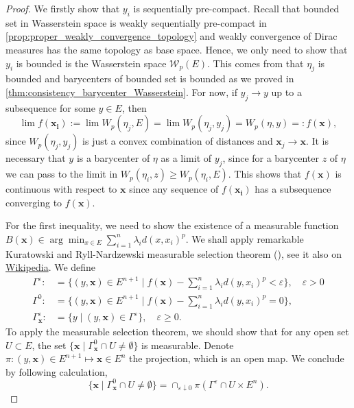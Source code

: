 \begin{proof}
	We firstly show that $y_i$ is sequentially pre-compact.
	Recall that bounded set in Wasserstein space is
	weakly sequentially pre-compact in \cref{prop:proper_weakly_convergence_topology}
	and weakly convergence of Dirac measures has the same topology as base space.
	Hence, we only need to show that $y_i$ is bounded is the Wasserstein space $\mathcal{W}_p(E)$.
	This comes from that $\eta_j$ is bounded and barycenters of bounded set is bounded as we proved in \cref{thm:consistency_barycenter_Wasserstein}.
	For now, if $y_j \rightarrow y$ up to a subsequence for some $y \in E$, then
	\[
		\lim f(\boldsymbol{x_i}) := \lim W_p(\eta_j, E) = \lim W_p(\eta_j, y_j) =  W_p(\eta, y) =: f(\boldsymbol{x}),
	\]
	since $W_p(\eta_j , y_j)$ is just a convex combination of distances and
	$\boldsymbol{x}_j \rightarrow \boldsymbol{x}$.
	It is necessary that $y$ is a barycenter of $\eta$ as a limit of $y_j$,
	since for a barycenter $z$ of $\eta$ we can pass to the limit in $W_p(\eta_i, z) \geq W_p(\eta_i, E)$.
	This shows that $f(\boldsymbol{x})$ is continuous with respect to $\boldsymbol{x}$ since
	any sequence of $f(\boldsymbol{x_i})$ has a subsequence converging to $f(\boldsymbol{x})$.

	For the first inequality,
	we need to show the existence of a measurable function $B(\boldsymbol{x}) \in \arg \min_{x \in E} \sum_{i=1}^{n} \lambda_i d(x, x_i)^p$.
	We shall apply remarkable Kuratowski and Ryll-Nardzewski measurable selection theorem (\cite[Theorem 6.9.3]{Bogachev2007}),
	see it also on \href{https://en.wikipedia.org/wiki/Kuratowski_and_Ryll-Nardzewski_measurable_selection_theorem}{Wikipedia}.
	We define
	\begin{align*}
		\Gamma^\varepsilon:                   & =	\{
		(y,\boldsymbol{x}) \in E^{n+1} \mid  f(\boldsymbol{x}) - \sum_{i=1}^{n} \lambda_i d(y,x_i)^p < \varepsilon
		\}, \quad \varepsilon > 0                                                                           \\
		\Gamma^0:                             & =	\{
		(y,\boldsymbol{x}) \in E^{n+1} \mid  f(\boldsymbol{x}) - \sum_{i=1}^{n} \lambda_i d(y,x_i)^p = 0
		\},                                                                                                 \\
		\Gamma^\varepsilon_{\boldsymbol{x}} : & = \{ y \mid (y, \boldsymbol{x} ) \in \Gamma^\varepsilon \},
		\quad \varepsilon \geq 0.
	\end{align*}
	To apply the measurable selection theorem,
	we should show that for any open set $U \subset E$, the set
	$\{ \boldsymbol{x} \mid \Gamma^0_{\boldsymbol{x}} \cap U \ne \emptyset \}$
	is measurable.
	Denote $\pi: (y , \boldsymbol{x}) \in E^{n+1} \mapsto  \boldsymbol{x} \in E^n$ the projection,
	which is an open map.
	We conclude by following calculation,
	\[
		\{ \boldsymbol{x} \mid \Gamma^0_{\boldsymbol{x}} \cap U \ne \emptyset \} =
		\cap_{\varepsilon \downarrow 0}
		\pi ( \Gamma^\varepsilon \cap U \times E^n ).
	\]


\end{proof}
